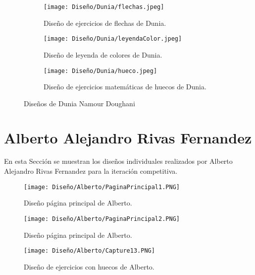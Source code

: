 \begin{figure}[ht!]
  \ContinuedFloat
  \begin{subfigure}{\textwidth}
    \centering
    \texttt{[image: Diseño/Dunia/flechas.jpeg]}
    \caption{Diseño de ejercicios de flechas de Dunia.}
    \label{dunia4}
  \end{subfigure}

  \begin{subfigure}{\textwidth}
    \centering
    \texttt{[image: Diseño/Dunia/leyendaColor.jpeg]}
    \caption{Diseño de leyenda de colores de Dunia.}
    \label{dunia5}
  \end{subfigure}

  \begin{subfigure}{\textwidth}
    \centering
    \texttt{[image: Diseño/Dunia/hueco.jpeg]}
    \caption{Diseño de ejercicios matemáticas de huecos de Dunia.}
    \label{dunia6}
  \end{subfigure}

  \caption{Diseños de Dunia Namour Doughani}
  \label{fig:disenyoDunia}
\end{figure}



\section{Alberto Alejandro Rivas Fernandez}
En esta Sección se muestran los diseños individuales realizados por Alberto Alejandro Rivas Fernandez para la iteración competitiva.

\begin{figure}[ht!]
  \centering
  \texttt{[image: Diseño/Alberto/PaginaPrincipal1.PNG]}
  \caption{Diseño página principal de Alberto.}
  \label{AlbertoPaginaPrincipal1}
\end{figure}

\begin{figure}[ht!]
  \centering
  \texttt{[image: Diseño/Alberto/PaginaPrincipal2.PNG]}
  \caption{Diseño página principal de Alberto.}
  \label{AlbertoPaginaPrincipal2}
\end{figure}


\begin{figure}[ht!]
  \centering
  \texttt{[image: Diseño/Alberto/Capture13.PNG]}
  \caption{Diseño de ejercicios con huecos de Alberto.}
  \label{Alberto13}
\end{figure}


